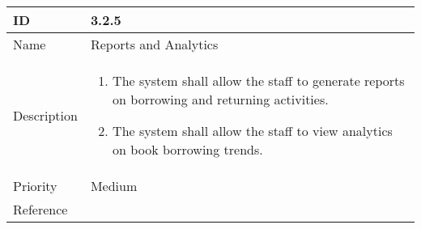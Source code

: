 \begin{center}
\begin{tabular}{ | m{5em} | m{6.5cm}|  } 
  \hline
  ID & 3.2.5\\ 
  \hline
  Name & Reports and Analytics\\ 
  \hline
  Description & 
  \begin{enumerate}
      \item The system shall allow the staff to generate reports on borrowing and returning activities.
      \item The system shall allow the staff to view analytics on book borrowing trends.
  \end{enumerate} \\
  \hline
  
  Priority & Medium\\
  \hline
  Reference & \\
  \hline
\end{tabular}
\end{center}  

